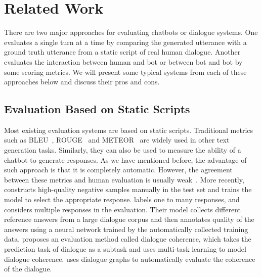 \section{Related Work}

There are two major approaches for evaluating chatbots or dialogue systems.
One evaluates a single turn at a time by comparing the generated utterance with
a ground truth utterance from a static script of real human dialogue.
Another evaluates the interaction between human and bot or between bot
and bot by some scoring metrics. We will present some typical systems from
each of these approaches below and discuss their pros and cons. 


\subsection{Evaluation Based on Static Scripts}

Most existing evaluation systems are based on static scripts. 
Traditional metrics such as BLEU~\citep{bleu}, ROUGE~\citep{lin-2004-rouge} 
and METEOR~\citep{banerjee-lavie-2005-meteor} are widely used in 
other text generation tasks. Similarly, they can also be used to measure the 
ability of a chatbot to generate responses. As we have mentioned before, 
the advantage of such approach is that it is completely automatic.
However, the agreement between these metrics and 
human evaluation is usually weak~\citep{liu-etal-2016-evaluate}. 
More recently, \citet{sato-etal-2020-evaluating} 
constructs high-quality negative samples manually in the test set and 
trains the model to select the appropriate response. 
\citet{yuma-etal-2020-ubleu} labels one to many responses, 
and considers multiple responses in the evaluation. 
Their model collects different reference answers from a large dialogue corpus 
and then annotates quality of the answers using a neural network 
trained by the automatically collected training data. 
\citet{mesgar-etal-2020-dialogue} proposes an evaluation method 
called dialogue coherence, which takes the prediction task of dialogue as a subtask and uses multi-task learning to model dialogue coherence. 
\citet{huang-etal-2020-grade} uses dialogue graphs to automatically 
evaluate the coherence of the dialogue. 


